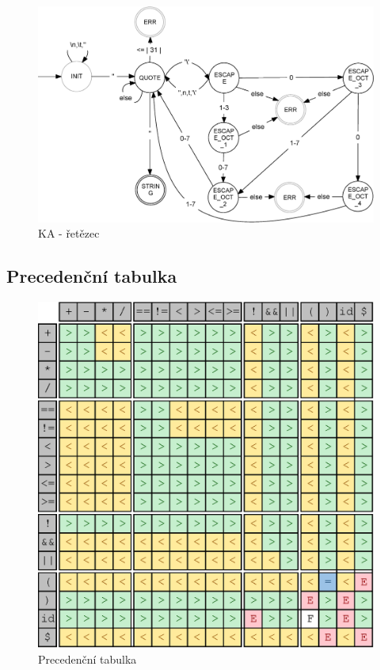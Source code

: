 \documentclass[a4paper,11pt]{article}
\begin{document}
\begin{figure}[H]
	\centering
	\includegraphics[scale=.31]{FSM_STRING.eps}
	\caption{KA - řetězec}
\end{figure}

\subsection{Precedenční tabulka}
\label{tab:SA-precedence}
\begin{figure}[H]
   \centering
   \includegraphics[]{precedence_tab.eps}
   \caption{Precedenční tabulka}
\end{figure}
\end{document}
